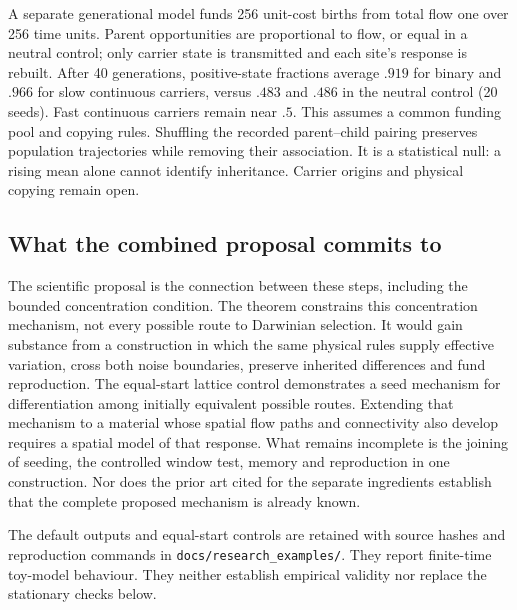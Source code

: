A separate generational model funds 256 unit-cost births from total flow one
over 256 time units. Parent opportunities are proportional to flow, or equal in
a neutral control; only carrier state is transmitted and each site's response
is rebuilt. After 40 generations, positive-state fractions average $.919$ for
binary and $.966$ for slow continuous carriers, versus $.483$ and $.486$ in the
neutral control (20 seeds). Fast continuous carriers remain near $.5$. This
assumes a common funding pool and copying rules. Shuffling the recorded
parent--child pairing preserves population trajectories while removing their
association. It is a statistical null: a rising mean alone cannot identify
inheritance. Carrier origins and physical copying remain open.

\subsection{What the combined proposal commits to}

The scientific proposal is the connection between these steps, including the
bounded concentration condition. The theorem constrains this concentration
mechanism, not every possible route to Darwinian selection. It would gain substance from a construction
in which the same physical rules supply effective variation, cross both noise
boundaries, preserve inherited differences and fund reproduction. The
equal-start lattice control demonstrates a seed mechanism for differentiation
among initially equivalent possible routes. Extending that mechanism to a
material whose spatial flow paths and connectivity also develop requires a
spatial model of that response. What remains incomplete is the joining of
seeding, the controlled window test, memory and reproduction in one construction.
Nor does the prior art cited for the separate ingredients establish that
the complete proposed mechanism is already known.

The default outputs and equal-start controls are retained with source hashes
and reproduction commands in \texttt{docs/research\_examples/}. They report
finite-time toy-model behaviour. They neither establish empirical validity nor
replace the stationary checks below.
